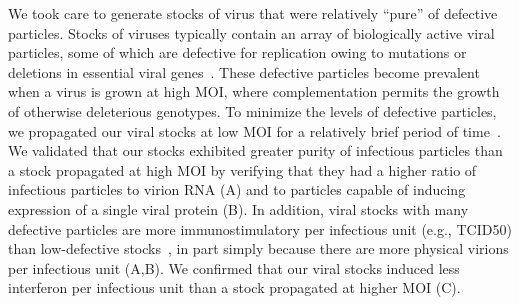 \documentclass[9pt,lineno]{elife}
\begin{document}
We took care to generate stocks of virus that were relatively ``pure'' of defective particles.
Stocks of viruses typically contain an array of biologically active viral particles, some of which are defective for replication owing to mutations or deletions in essential viral genes~\citep{von1954incomplete,huang1970defective,Brooke:2014ch,Fonville:2015cg,Lauring:2010if,Dimmock:2014dk,saira2013sequence}.
These defective particles become prevalent when a virus is grown at high MOI, where complementation permits the growth of otherwise deleterious genotypes.
To minimize the levels of defective particles, we propagated our viral stocks at low MOI for a relatively brief period of time~\citep{Xue:2016bw}.
We validated that our stocks exhibited greater purity of infectious particles than a stock propagated at high MOI by verifying that they had a higher ratio of infectious particles to virion RNA (A) and to particles capable of inducing expression of a single viral protein (B).
In addition, viral stocks with many defective particles are more immunostimulatory per infectious unit (e.g., TCID50) than low-defective stocks~\citep{Tapia:2013kf,Lopez:2014en}, in part simply because there are more physical virions per infectious unit (A,B).
We confirmed that our viral stocks induced less interferon per infectious unit than a stock propagated at higher MOI (C).
\end{document}
